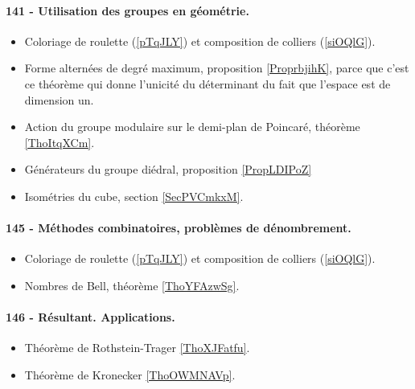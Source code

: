 \paragraph{141 - Utilisation des groupes en géométrie.}
\begin{itemize}
    \item Coloriage de roulette (\ref{pTqJLY}) et composition de colliers (\ref{siOQlG}).
    \item Forme alternées de degré maximum, proposition \ref{ProprbjihK}, parce que c'est ce théorème qui donne l'unicité du déterminant du fait que l'espace est de dimension un.
    \item Action du groupe modulaire sur le demi-plan de Poincaré, théorème \ref{ThoItqXCm}.
    \item Générateurs du groupe diédral, proposition \ref{PropLDIPoZ}
    \item Isométries du cube, section \ref{SecPVCmkxM}.
\end{itemize}
\paragraph{145 - Méthodes combinatoires, problèmes de dénombrement.}
\begin{itemize}
    \item Coloriage de roulette (\ref{pTqJLY}) et composition de colliers (\ref{siOQlG}).
    \item Nombres de Bell, théorème \ref{ThoYFAzwSg}.
\end{itemize}
\paragraph{146 - Résultant. Applications.}
\begin{itemize}
    \item Théorème de Rothstein-Trager \ref{ThoXJFatfu}.
    \item Théorème de Kronecker \ref{ThoOWMNAVp}.
\end{itemize}

